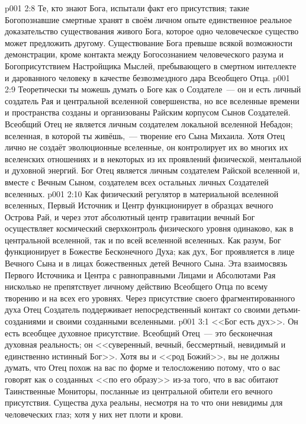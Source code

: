 \vs p001 2:8 Те, кто знают Бога, испытали факт его присутствия; такие Богопознавшие смертные хранят в своём личном опыте единственное реальное доказательство существования живого Бога, которое одно человеческое существо может предложить другому. Существование Бога превыше всякой возможности демонстрации, кроме контакта между Богосознанием человеческого разума и Богоприсутствием Настройщика Мыслей, пребывающего в смертном интеллекте и дарованного человеку в качестве безвозмездного дара Всеобщего Отца.
\vs p001 2:9 \pc Теоретически ты можешь думать о Боге как о Создателе~--- он и есть личный создатель Рая и центральной вселенной совершенства, но все вселенные времени и пространства созданы и организованы Райским корпусом Сынов Создателей. Всеобщий Отец не является личным создателем локальной вселенной Небадон; вселенная, в которой ты живёшь,~--- творение его Сына Михаила. Хотя Отец лично не создаёт эволюционные вселенные, он контролирует их во многих их вселенских отношениях и в некоторых из их проявлений физической, ментальной и духовной энергий. Бог Отец является личным создателем Райской вселенной и, вместе с Вечным Сыном, создателем всех остальных личных Создателей вселенных.
\vs p001 2:10 \pc Как физический регулятор в материальной вселенной вселенных, Первый Источник и Центр функционирует в образцах вечного Острова Рай, и через этот абсолютный центр гравитации вечный Бог осуществляет космический сверхконтроль физического уровня одинаково, как в центральной вселенной, так и по всей вселенной вселенных. Как разум, Бог функционирует в Божестве Бесконечного Духа; как дух, Бог проявляется в лице Вечного Сына и в лицах божественных детей Вечного Сына. Эта взаимосвязь Первого Источника и Центра с равноправными Лицами и Абсолютами Рая нисколько не препятствует  личному действию Всеобщего Отца по всему творению и на всех его уровнях. Через присутствие своего фрагментированного духа Отец Создатель поддерживает непосредственный контакт со своими детьми\hyp{}созданиями и своими созданными вселенными.
\vs p001 3:1 <<Бог есть дух>>. Он есть всеобщее духовное присутствие. Всеобщий Отец~--- это бесконечная духовная реальность; он <<суверенный, вечный, бессмертный, невидимый и единственно истинный Бог>>. Хотя вы и <<род Божий>>, вы не должны думать, что Отец похож на вас по форме и телосложению потому, что о вас говорят как о созданных <<по его образу>> из\hyp{}за того, что в вас обитают Таинственные Мониторы, посланные из центральной обители его вечного присутствия. Существа духа реальны, несмотря на то что они невидимы для человеческих глаз; хотя у них нет плоти и крови.
